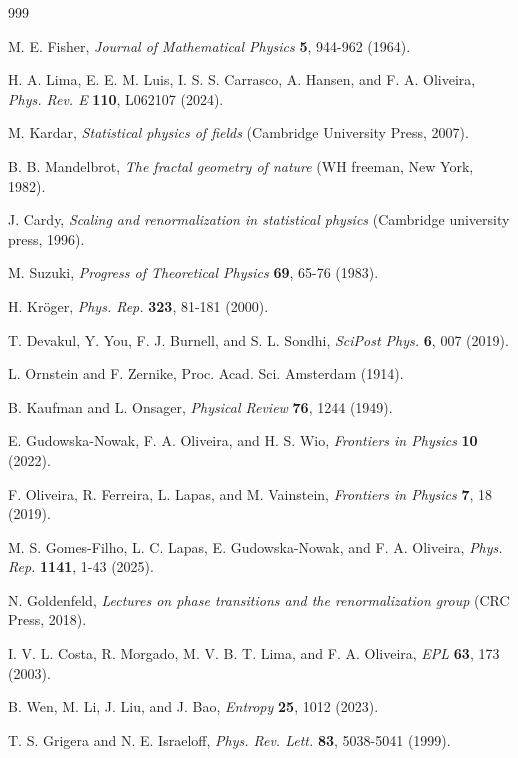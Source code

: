 \documentclass[pre,aps,twocolumn,showpacs,floatfix,nofootinbib,superscriptaddress,linenumbers]{revtex4-1}
\begin{document}
\begin{thebibliography}{999}

 M. E. Fisher, \textit{Journal of Mathematical Physics} \textbf{5}, 944-962 (1964).

 H. A. Lima, E. E. M. Luis, I. S. S. Carrasco, A. Hansen, and F. A. Oliveira, \textit{Phys. Rev. E} \textbf{110}, L062107 (2024).

 M. Kardar, \textit{Statistical physics of fields} (Cambridge University Press, 2007).

 B. B. Mandelbrot, \textit{The fractal geometry of nature} (WH freeman, New York, 1982).

 J. Cardy, \textit{Scaling and renormalization in statistical physics} (Cambridge university press, 1996).

 M. Suzuki, \textit{Progress of Theoretical Physics} \textbf{69}, 65-76 (1983).

 H. Kr{\"o}ger, \textit{Phys. Rep.} \textbf{323}, 81-181 (2000).

 T. Devakul, Y. You, F. J. Burnell, and S. L. Sondhi, \textit{SciPost Phys.} \textbf{6}, 007 (2019).

 L. Ornstein and F. Zernike, Proc. Acad. Sci. Amsterdam (1914).

 B. Kaufman and L. Onsager, \textit{Physical Review} \textbf{76}, 1244 (1949).

 E. Gudowska-Nowak, F. A. Oliveira, and H. S. Wio, \textit{Frontiers in Physics} \textbf{10} (2022).

 F. Oliveira, R. Ferreira, L. Lapas, and M. Vainstein, \textit{Frontiers in Physics} \textbf{7}, 18 (2019).

 M. S. Gomes-Filho, L. C. Lapas, E. Gudowska-Nowak, and F. A. Oliveira, \textit{Phys. Rep.} \textbf{1141}, 1-43 (2025).

 N. Goldenfeld, \textit{Lectures on phase transitions and the renormalization group} (CRC Press, 2018).

 I. V. L. Costa, R. Morgado, M. V. B. T. Lima, and F. A. Oliveira, \textit{EPL} \textbf{63}, 173 (2003).

 B. Wen, M. Li, J. Liu, and J. Bao, \textit{Entropy} \textbf{25}, 1012 (2023).

 T. S. Grigera and N. E. Israeloff, \textit{Phys. Rev. Lett.} \textbf{83}, 5038-5041 (1999).


\end{thebibliography}
\end{document}
